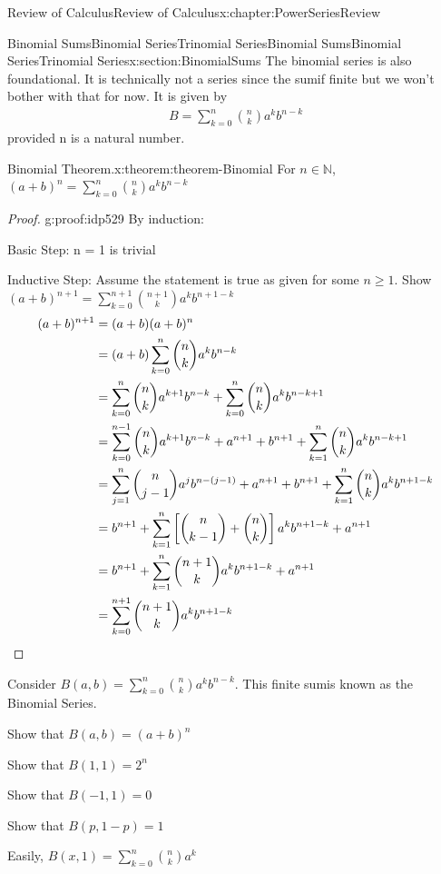 \documentclass[oneside,10pt,]{book}
\newcommand{\qedhere}{\relax}
\numberwithin{equation}{section}
\begin{document}
\begin{chapterptx}{Review of Calculus}{}{Review of Calculus}{}{}{x:chapter:PowerSeriesReview}
\begin{sectionptx}{Binomial SumsBinomial SeriesTrinomial Series}{}{Binomial SumsBinomial SeriesTrinomial Series}{}{}{x:section:BinomialSums}
The binomial series is also foundational. It is technically not a series since the sum\textunderscore{}if finite but we won’t bother with that for now. It is given by%
%
\begin{gather*}
B = \sum_{k=0}^{n} {\binom{n}{k} a^k b^{n-k}}
\end{gather*}
provided n is a natural number. \begin{theorem}{Binomial Theorem.}{}{x:theorem:theorem-Binomial}%
For \(n \in \mathbb{N} \), \(\displaystyle {(a+b)^n = \sum_{k=0}^{n} {\binom{n}{k} a^k b^{n-k}}}\)\end{theorem}
\begin{proof}{}{g:proof:idp529}
By induction:%
\par
Basic Step: n = 1 is trivial%
\par
Inductive Step:  Assume the statement is true as given for some \(n \ge 1\). Show \((a+b)^{n+1} = \sum_{k=0}^{n+1} {\binom{n+1}{k} a^k b^{n+1-k}}\)%
%
\begin{align*}
(a+b)^{n+1} & = (a+b)(a+b)^n\\
& = (a+b)\sum_{k=0}^{n} {\binom{n}{k} a^k b^{n-k}}\\
& = \sum_{k=0}^n \binom{n}{k} a^{k+1} b^{n-k} + \sum_{k=0}^n \binom{n}{k} a^k b^{n-k+1}\\
& = \sum_{k=0}^{n-1} \binom{n}{k} a^{k+1} b^{n-k} + a^{n+1} + b^{n+1} + \sum_{k=1}^n \binom{n}{k} a^k b^{n-k+1}\\
& = \sum_{j=1}^n \binom{n}{j-1} a^j b^{n-(j-1)} + a^{n+1} + b^{n+1} + \sum_{k=1}^n \binom{n}{k} a^k b^{n+1-k}\\
& = b^{n+1} + \sum_{k=1}^n \left [ \binom{n}{k-1} + \binom{n}{k} \right ] a^k b^{n+1-k} + a^{n+1}\\
& = b^{n+1} + \sum_{k=1}^n \binom{n+1}{k} a^k b^{n+1-k} + a^{n+1}\\
& = \sum_{k=0}^{n+1} \binom{n+1 }{k} a^k b^{n+1-k}\qedhere
\end{align*}
\end{proof}
Consider \(B(a,b) = \sum_{k=0}^{n} {\binom{n}{k} a^k b^{n-k}}\). This finite sum\textunderscore{}is known as the Binomial Series.%
\par
Show that \(B(a,b) = (a+b)^n\)%
\par
Show that \(B(1,1) = 2^n\)%
\par
Show that \(B(-1,1) = 0\)%
\par
Show that \(B(p,1-p) = 1\)%
\par
Easily, \(B(x,1) = \sum_{k=0}^{n} {\binom{n}{k} a^k}\)%
%
\begin{gather*}

\end{gather*}
\end{sectionptx}
\end{chapterptx}
\end{document}
